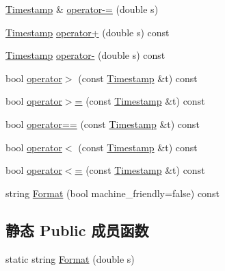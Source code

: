 \begin{DoxyCompactItemize}
\item 
\hyperlink{classDUtils_1_1Timestamp}{Timestamp} \& \hyperlink{classDUtils_1_1Timestamp_a775ece4a7fab156430da57da985a8965}{operator-\/=} (double s)
\item 
\hyperlink{classDUtils_1_1Timestamp}{Timestamp} \hyperlink{classDUtils_1_1Timestamp_adf1cd902ca81aedd5ef955b476f82680}{operator+} (double s) const 
\item 
\hyperlink{classDUtils_1_1Timestamp}{Timestamp} \hyperlink{classDUtils_1_1Timestamp_a81b79de4057df40d4d6a2a86131ab6f5}{operator-\/} (double s) const 
\item 
bool \hyperlink{classDUtils_1_1Timestamp_a121756e11835f28fbc5e796e46e7b7d2}{operator$>$} (const \hyperlink{classDUtils_1_1Timestamp}{Timestamp} \&t) const 
\item 
bool \hyperlink{classDUtils_1_1Timestamp_a3f2ba4c752f7b966a31af1b97cabf544}{operator$>$=} (const \hyperlink{classDUtils_1_1Timestamp}{Timestamp} \&t) const 
\item 
bool \hyperlink{classDUtils_1_1Timestamp_a921d279e4c61f1d00d2d278b0060acc0}{operator==} (const \hyperlink{classDUtils_1_1Timestamp}{Timestamp} \&t) const 
\item 
bool \hyperlink{classDUtils_1_1Timestamp_ace722f049a59fc1baf067a03659692d4}{operator$<$} (const \hyperlink{classDUtils_1_1Timestamp}{Timestamp} \&t) const 
\item 
bool \hyperlink{classDUtils_1_1Timestamp_aa0b04c8c29808b7f4f31eb123a5678f1}{operator$<$=} (const \hyperlink{classDUtils_1_1Timestamp}{Timestamp} \&t) const 
\item 
string \hyperlink{classDUtils_1_1Timestamp_a38cdda9c05d592f7794a1111ac3da618}{Format} (bool machine\-\_\-friendly=false) const 
\end{DoxyCompactItemize}
\subsection*{静态 Public 成员函数}
\begin{DoxyCompactItemize}
\item 
static string \hyperlink{classDUtils_1_1Timestamp_abd63d0a2abc2209f9300296ee3e85265}{Format} (double s)
\end{DoxyCompactItemize}
